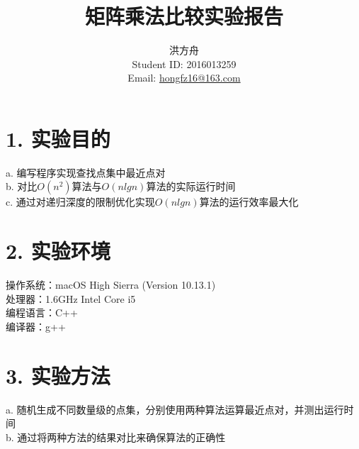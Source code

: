 \documentclass[12pt]{article}
\title{矩阵乘法比较实验报告}
\author{洪方舟\\Student ID: 2016013259\\Email: \href{mailto:hongfz16@163.com}{hongfz16@163.com}}
\begin{document}
  \maketitle
  \section*{1. 实验目的}
  a. 编写程序实现查找点集中最近点对\\
  b. 对比$O(n^2)$算法与$O(nlgn)$算法的实际运行时间\\
  c. 通过对递归深度的限制优化实现$O(nlgn)$算法的运行效率最大化
  \section*{2. 实验环境}
  操作系统：macOS High Sierra (Version 10.13.1)\\
  处理器：1.6GHz Intel Core i5\\
  编程语言：C++\\
  编译器：g++
  \section*{3. 实验方法}
  a. 随机生成不同数量级的点集，分别使用两种算法运算最近点对，并测出运行时间\\
  b. 通过将两种方法的结果对比来确保算法的正确性
  \newpage
\end{document}
